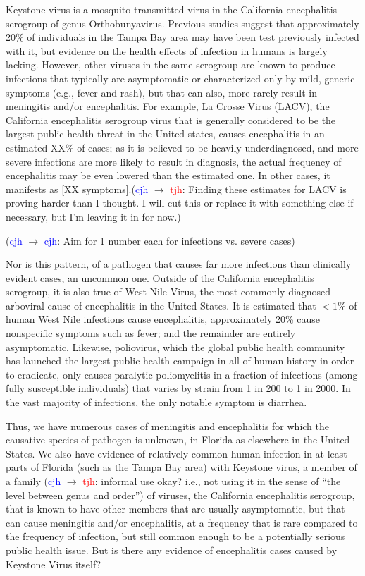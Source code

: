 \documentclass[12pt]{article}
\newcommand{\cjh}{\textcolor{blue}{cjh}}
\newcommand{\tjh}{\textcolor{red}{tjh}}
\newcommand{\msg}[3]{(#1 $\rightarrow$ #2: #3)}
\newcommand{\mcc}[1]{\msg\cjh\cjh{#1}}
\newcommand{\mct}[1]{\msg\cjh\tjh{#1}}
\begin{document}
        Keystone virus is a mosquito-transmitted virus in the California encephalitis serogroup of genus Orthobunyavirus. Previous studies suggest that approximately 20\% of individuals in the Tampa Bay area may have been test previously infected with it, but evidence on the health effects of infection in humans is largely lacking. However, other viruses in the same serogroup are known to produce infections that typically are asymptomatic or characterized only by mild, generic symptoms (e.g., fever and rash), but that can also, more rarely result in meningitis and/or encephalitis. For example, La Crosse Virus (LACV), the California encephalitis serogroup virus that is generally considered to be the largest public health threat in the United states, causes encephalitis in an estimated XX\% of cases; as it is believed to be heavily underdiagnosed, and more severe infections are more likely to result in diagnosis, the actual frequency of encephalitis may be even lowered than the estimated one. In other cases, it manifests as [XX symptoms].\mct{Finding these estimates for LACV is proving harder than I thought. I will cut this or replace it with something else if necessary, but I'm leaving it in for now.}

        \mcc{Aim for 1 number each for infections vs. severe cases}

        Nor is this pattern, of a pathogen that causes far more infections than clinically evident cases, an uncommon one. Outside of the California encephalitis serogroup, it is also true of West Nile Virus, the most commonly diagnosed arboviral cause of encephalitis in the United States. It is estimated that $<1\%$ of human West Nile infections cause encephalitis, approximately 20\% cause nonspecific symptoms such as fever; and the remainder are entirely asymptomatic\cite{asdf}. Likewise, poliovirus, which the global public health community has launched the largest public health campaign in all of human history in order to eradicate, only causes paralytic poliomyelitis in a fraction of infections (among fully susceptible individuals) that varies by strain from 1 in 200 to 1 in 2000. In the vast majority of infections, the only notable symptom is diarrhea.

        Thus, we have numerous cases of meningitis and encephalitis for which the causative species of pathogen is unknown, in Florida as elsewhere in the United States. We also have evidence of relatively common human infection in at least parts of Florida (such as the Tampa Bay area) with Keystone virus, a member of a family \mct{informal use okay? i.e., not using it in the sense of ``the level between genus and order''} of viruses, the California encephalitis serogroup, that is known to have other members that are usually asymptomatic, but that can cause meningitis and/or encephalitis, at a frequency that is rare compared to the frequency of infection, but still common enough to be a potentially serious public health issue. But is there any evidence of encephalitis cases caused by Keystone Virus itself?
\end{document}
